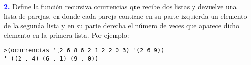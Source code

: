 \textbf{\textcolor{blue}{2.}} \Large
Define la función recursiva ocurrencias que recibe dos listas y devuelve una lista de parejas,
en donde cada pareja contiene en su parte izquierda un elemento de la segunda lista y en su
parte derecha el número de veces que aparece dicho elemento en la primera lista. Por ejemplo:

\begin{lstlisting}
>(ocurrencias '(2 6 8 6 2 1 2 2 0 3) '(2 6 9))
' ((2 . 4) (6 . 1) (9 . 0))
\end{lstlisting}
